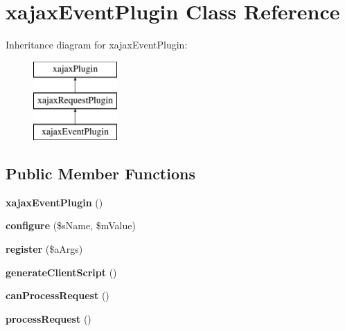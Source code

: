 \hypertarget{classxajaxEventPlugin}{
\section{xajaxEventPlugin Class Reference}
\label{classxajaxEventPlugin}
}
Inheritance diagram for xajaxEventPlugin:\begin{figure}[H]
\begin{center}
\leavevmode
\includegraphics[height=3.000000cm]{classxajaxEventPlugin}
\end{center}
\end{figure}
\subsection*{Public Member Functions}
\begin{DoxyCompactItemize}
\item 
\hypertarget{classxajaxEventPlugin_aca55fd6e7a8b0b93a03d282e2635cdd8}{
{\bfseries xajaxEventPlugin} ()}
\label{classxajaxEventPlugin_aca55fd6e7a8b0b93a03d282e2635cdd8}

\item 
\hypertarget{classxajaxEventPlugin_addb5a324fd6e91219bfa94804a7b0262}{
{\bfseries configure} (\$sName, \$mValue)}
\label{classxajaxEventPlugin_addb5a324fd6e91219bfa94804a7b0262}

\item 
\hypertarget{classxajaxEventPlugin_ad5a044886a83de9997c9ab4877e90a47}{
{\bfseries register} (\$aArgs)}
\label{classxajaxEventPlugin_ad5a044886a83de9997c9ab4877e90a47}

\item 
\hypertarget{classxajaxEventPlugin_ae01ff1c5168ea434678ba3d083f81817}{
{\bfseries generateClientScript} ()}
\label{classxajaxEventPlugin_ae01ff1c5168ea434678ba3d083f81817}

\item 
\hypertarget{classxajaxEventPlugin_abd5ceab561515c8f7e95a0f4b01ce544}{
{\bfseries canProcessRequest} ()}
\label{classxajaxEventPlugin_abd5ceab561515c8f7e95a0f4b01ce544}

\item 
\hypertarget{classxajaxEventPlugin_afaaa6d074811b8b4893c8b366e9f1805}{
{\bfseries processRequest} ()}
\label{classxajaxEventPlugin_afaaa6d074811b8b4893c8b366e9f1805}

\end{DoxyCompactItemize}
